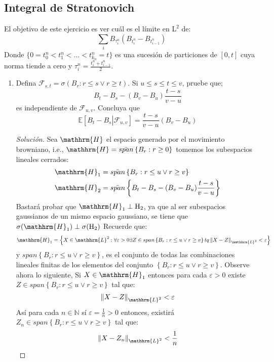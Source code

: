 \documentclass[11pt,notitlepage]{article}
\newenvironment{solucion}
  {\begin{proof}[Solución]}
  {\end{proof}}
\begin{document}
\subsection{Integral de Stratonovich} El objetivo de este ejercicio es ver cuál es el límite en \(\mathrm{L}^2\) de: 
\[\sum_{i} B_{\tau_{i}^{n}}\left(B_{t_{i}^{n}}- B_{t_{i-1}^{n}} \right)\]
Donde \(\{0 = t_{0}^{n} < t_{1}^{n} < \hdots < t_{k_n}^{n} = t\}\) es una sucesión de particiones de \([0,t]\) cuya norma tiende a cero y 
\(\tau_{i}^{n}  = \frac{ t_{i}^{n} +  t_{i-1}^{n}}{2}.\) 
\begin{enumerate}
    \item Defina \(\mathcal{F}_{s,t} = \sigma\left(B_r : r\leq s \vee r \geq t\right)\). Si \(u \leq s \leq t \leq v\), pruebe que; 
    \[B_t -B_s -(B_v -B_u)\frac{t-s}{v-u}\]
    es independiente de \(\mathcal{F}_{u,v}\). Concluya que 
    \[\mathbb{E}\left[B_t - B_s \left|\right. \mathcal{F}_{u,v} \right] = \frac{t-s}{v-u}(B_v - B_u)\]
    \begin{solucion}
    Sea \(\mathhrm{H}\) el espacio generado por el movimiento browniano, i.e., \(\mathhrm{H}=\bar{span}\left\{B_r :r \geq 0\right\}\) tomemos los 
    subespacios lineales cerrados:
    \begin{align*}
        \mathhrm{H}_{1} &= \bar{span}\left\{B_r : r\leq u \vee r \geq v \right\}\\
        \mathhrm{H}_{2} &= \bar{span}\left\{B_t -B_s -(B_v -B_u)\frac{t-s}{v-u} \right\}
    \end{align*}
    Bastará probar que \(\mathhrm{H}_1 \perp \mathrm{H}_2\), ya que al ser subespacios gaussianos de un mismo espacio gaussiano, se tiene que \(\sigma(\mathhrm{H}_1) \perp \sigma(\mathrm{H}_2)\)
    Recuerde que: 
    \[\mathhrm{H}_{1} = \left\{X\in\mathhrm{L}^2 : \forall \varepsilon >0 \exists Z\in span\left\{B_r : r\leq u \vee r \geq v \right\} tq \left \|X - Z \right \|_{\mathhrm{L}^2} < \varepsilon\right\}\] 
    y \(span\left\{B_r : r\leq u \vee r \geq v \right\}\), es el conjunto de todas las combinaciones lineales finitas de los elementos del conjunto \(\left\{B_r : r\leq u \vee r \geq v \right\}\). Observe ahora lo siguiente, Si \(X\in \mathhrm{H}_{1} \) entonces para cada \(\varepsilon >0\) existe \( Z\in span\left\{B_r : r\leq u \vee r \geq v \right\}\) tal que:
    \[\left \|X - Z \right \|_{\mathhrm{L}^2} < \varepsilon\] 
    Así para cada \(n \in \mathbb{N}\) sí \(\varepsilon = \frac{1}{n}>0\) entonces, existirá \(Z_n\in span\left\{B_r : r\leq u \vee r \geq v \right\}\) tal que:
    \[\left \|X - Z_n \right \|_{\mathhrm{L}^2} < \frac{1}{n}\]

\end{solucion}
\end{enumerate}
\end{document}
